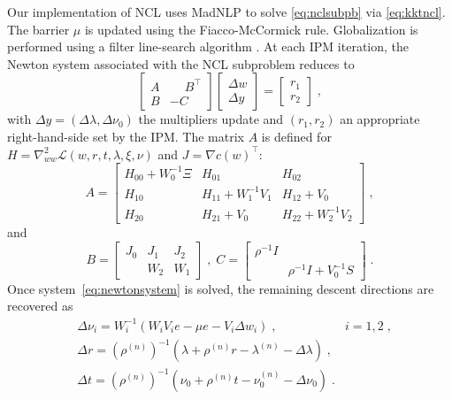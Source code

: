 \documentclass{IEEEtran4PSCC}
\begin{document}
Our implementation of NCL uses MadNLP to solve \eqref{eq:nclsubpb} via \eqref{eq:kktncl}. The barrier $\mu$ is updated
using the Fiacco-McCormick rule. Globalization is performed using a filter line-search
algorithm \cite{wachter2006implementation}. At each IPM iteration, the Newton system associated with the NCL subproblem reduces to
\begin{equation}
  \label{eq:newtonsystem}
  \begin{bmatrix}
    A & \phantom{-}B^\top \\
    B & -C
  \end{bmatrix}
  \begin{bmatrix}
    \Delta w \\ \Delta y
  \end{bmatrix}
  =
  \begin{bmatrix}
    r_1 \\ r_2
  \end{bmatrix}
  \; ,
\end{equation}
with $\Delta y = (\Delta \lambda, \Delta \nu_0)$ the multipliers update
and $(r_1, r_2)$ an appropriate right-hand-side set by the IPM.
The matrix $A$ is defined for $H = \nabla^2_{ww} \mathcal{L}(w, r, t, \lambda,\xi,\nu)$
and $J = \nabla c(w)^\top$:
\begin{equation*}
  \label{eq:blockA}
  A = \begin{bmatrix}
    H_{00} + W_0^{-1} \Xi & H_{01} & H_{02} \\
    H_{10} & H_{11} + W_1^{-1} V_1 & H_{12} + V_0 \\
    H_{20} & H_{21} + V_0 & H_{22} + W_2^{-1} V_2
  \end{bmatrix} \; ,
\end{equation*}
and
\begin{equation*}
  \label{eq:blockBC}
  B = \begin{bmatrix}
    J_0 & J_1 & J_2 \\
      & W_2 & W_1
  \end{bmatrix} \; , \;
  C = \begin{bmatrix}
    \rho^{-1} I &   \\
    & \rho^{-1} I + V_0^{-1} S
    \end{bmatrix} \; .
\end{equation*}
Once system~\eqref{eq:newtonsystem} is solved, the remaining
descent directions are recovered as
\begin{equation*}
  \begin{aligned}
    & \Delta \nu_i = W_i^{-1} (W_i V_ie - \mu e - V_i \Delta w_i)\;,   & i = 1,2 \; , \\
    & \Delta r = (\rho^{(n)})^{-1} (\lambda + \rho^{(n)} r - \lambda^{(n)} - \Delta \lambda) \; ,\\
    & \Delta t = (\rho^{(n)})^{-1} (\nu_0 + \rho^{(n)} t - \nu_0^{(n)} - \Delta \nu_0) \; .
  \end{aligned}
\end{equation*}
\end{document}
